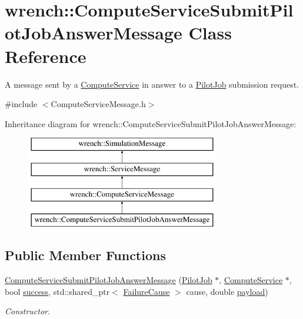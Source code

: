 \hypertarget{classwrench_1_1_compute_service_submit_pilot_job_answer_message}{}\section{wrench\+:\+:Compute\+Service\+Submit\+Pilot\+Job\+Answer\+Message Class Reference}
\label{classwrench_1_1_compute_service_submit_pilot_job_answer_message}


A message sent by a \hyperlink{classwrench_1_1_compute_service}{Compute\+Service} in answer to a \hyperlink{classwrench_1_1_pilot_job}{Pilot\+Job} submission request.  




{\ttfamily \#include $<$Compute\+Service\+Message.\+h$>$}

Inheritance diagram for wrench\+:\+:Compute\+Service\+Submit\+Pilot\+Job\+Answer\+Message\+:\begin{figure}[H]
\begin{center}
\leavevmode
\includegraphics[height=4.000000cm]{classwrench_1_1_compute_service_submit_pilot_job_answer_message}
\end{center}
\end{figure}
\subsection*{Public Member Functions}
\begin{DoxyCompactItemize}
\item 
\hyperlink{classwrench_1_1_compute_service_submit_pilot_job_answer_message_a6a6e7ec7535de8a3ecfab14ca982a3a6}{Compute\+Service\+Submit\+Pilot\+Job\+Answer\+Message} (\hyperlink{classwrench_1_1_pilot_job}{Pilot\+Job} $\ast$, \hyperlink{classwrench_1_1_compute_service}{Compute\+Service} $\ast$, bool \hyperlink{classwrench_1_1_compute_service_submit_pilot_job_answer_message_a6890ec4e5c27a7a2265e9608a1d495d1}{success}, std\+::shared\+\_\+ptr$<$ \hyperlink{classwrench_1_1_failure_cause}{Failure\+Cause} $>$ cause, double \hyperlink{classwrench_1_1_simulation_message_a914f2732713f7c02898e66f05a7cb8a1}{payload})
\begin{DoxyCompactList}\small\item\em Constructor. \end{DoxyCompactList}\end{DoxyCompactItemize}
